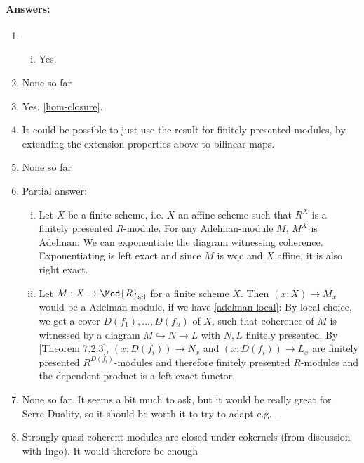 \paragraph{Answers:}
\begin{enumerate}
\item \begin{enumerate}[(i)]
\item Yes.
\end{enumerate}
\item None so far
\item Yes, \cref{hom-closure}.
\item It could be possible to just use the result for finitely presented modules, by extending the extension properties above to bilinear maps.
\item None so far
\item Partial answer:
\begin{enumerate}[(i)]
\item Let $X$ be a finite scheme, i.e. $X$ an affine scheme such that $R^X$ is a finitely presented $R$-module.
  For any Adelman-module $M$, $M^X$ is Adelman: We can exponentiate the diagram witnessing coherence.
  Exponentiating is left exact and since $M$ is wqc and $X$ affine, it is also right exact.
\item Let $M:X\to \Mod{R}_{\mathrm{ad}}$ for a finite scheme $X$. Then $(x:X)\to M_x$ would be a Adelman-module, if we have \cref{adelman-local}: By local choice, we get a cover $D(f_1),\dots,D(f_n)$ of $X$, such that coherence of $M$ is witnessed by a diagram $M\hookrightarrow N \to L$ with $N,L$ finitely presented. By \cite{draft}[Theorem 7.2.3], $(x:D(f_i))\to N_x$ and $(x:D(f_i))\to L_x$ are finitely presented $R^{D(f_i)}$-modules and therefore finitely presented $R$-modules and the dependent product is a left exact functor.
\end{enumerate}
\item None so far. It seems a bit much to ask, but it would be really great for Serre-Duality, so it should be worth it to try to adapt e.g.\ \cite[19.1.3]{vakil}.
\item Strongly quasi-coherent modules are closed under cokernels (from discussion with Ingo). It would therefore be enough
\end{enumerate}
